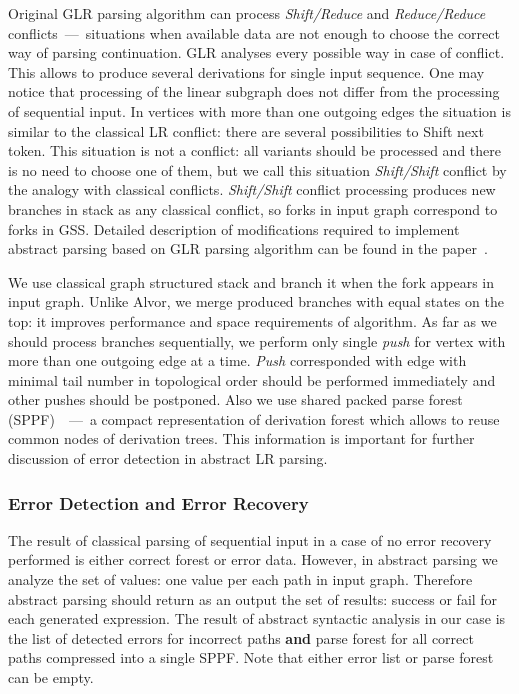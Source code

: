 \documentclass{acm_proc_article-sp}
\begin{document}
Original GLR parsing algorithm can process {\it Shift/Reduce} and {\it Reduce/Reduce} conflicts~---~situations when available data are not enough to choose the correct way of parsing continuation. GLR analyses every possible way in case of conflict. This allows to produce several derivations for single input sequence. One may notice that processing of the linear subgraph does not differ from the processing of sequential input. In vertices with more than one outgoing edges the situation is similar to the classical LR conflict: there are several possibilities to Shift next token. This situation is not a conflict: all variants should be processed and there is no need to choose one of them, but we call this situation {\it Shift/Shift} conflict by the analogy with classical conflicts. {\it Shift/Shift} conflict processing produces new branches in stack as any classical conflict, so forks in input graph correspond to forks in GSS. Detailed description of modifications required to implement abstract parsing based on GLR parsing algorithm can be found in the paper~\cite{AGLR}.

We use classical graph structured stack and branch it when the fork appears in input graph. Unlike Alvor, we merge produced branches with equal states on the top: it improves performance and space requirements of algorithm. As far as we should process branches sequentially, we perform only single {\it push} for vertex with more than one outgoing edge at a time. {\it Push} corresponded with edge with minimal tail number in topological order should be performed immediately and other pushes should be postponed. Also we use shared packed parse forest (SPPF)~\cite{SPPF}~---~a compact representation of derivation forest which allows to reuse common nodes of derivation trees. This information is important for further discussion of error detection in abstract LR parsing.\newline 
    

\subsubsection{Error Detection and Error Recovery}

The result of classical parsing of sequential input in a case of no error recovery performed is either correct forest or error data. However, in abstract parsing we analyze the set of values: one value per each path in input graph. Therefore abstract parsing should return as an output the set of results: success or fail for each generated expression. The result of abstract syntactic analysis in our case is the list of detected errors for incorrect paths {\bf and} parse forest for all correct paths compressed into a single SPPF. Note that either error list or parse forest can be empty.
\end{document}
